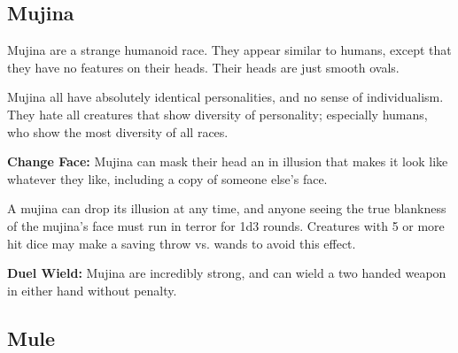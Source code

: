 \begin{multicols*}{2}
\subsection{Mujina}

Mujina are a strange humanoid race. They appear similar to humans, except that they have no features on their heads. Their heads are just smooth ovals.

Mujina all have absolutely identical personalities, and no sense of individualism. They hate all creatures that show diversity of personality; especially humans, who show the most diversity of all races.

\textbf{Change Face:} Mujina can mask their head an in illusion that makes it look like whatever they like, including a copy of someone else’s face.

A mujina can drop its illusion at any time, and anyone seeing the true blankness of the mujina’s face must run in terror for 1d3 rounds. Creatures with 5 or more hit dice may make a saving throw vs. wands to avoid this effect.

\textbf{Duel Wield:} Mujina are incredibly strong, and can wield a two handed weapon in either hand without penalty.

\subsection{Mule}
\end{multicols*}
